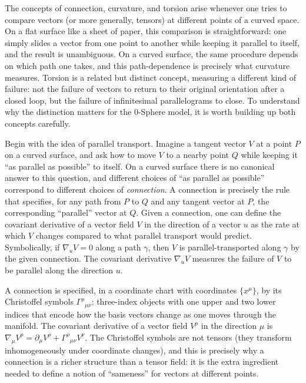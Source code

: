 \documentclass[%
 reprint,
 amsmath,amssymb,
 aps,
 prb,
]{revtex4-2}
\numberwithin{equation}{section}
\begin{document}
The concepts of connection, curvature, and torsion arise whenever one tries to compare vectors (or more generally, tensors) at different points of a curved space. On a flat surface like a sheet of paper, this comparison is straightforward: one simply slides a vector from one point to another while keeping it parallel to itself, and the result is unambiguous. On a curved surface, the same procedure depends on which path one takes, and this path-dependence is precisely what curvature measures. Torsion is a related but distinct concept, measuring a different kind of failure: not the failure of vectors to return to their original orientation after a closed loop, but the failure of infinitesimal parallelograms to close. To understand why the distinction matters for the 0-Sphere model, it is worth building up both concepts carefully.

Begin with the idea of parallel transport. Imagine a tangent vector $V$ at a point $P$ on a curved surface, and ask how to move $V$ to a nearby point $Q$ while keeping it ``as parallel as possible'' to itself. On a curved surface there is no canonical answer to this question, and different choices of ``as parallel as possible'' correspond to different choices of \emph{connection}. A connection is precisely the rule that specifies, for any path from $P$ to $Q$ and any tangent vector at $P$, the corresponding ``parallel'' vector at $Q$. Given a connection, one can define the covariant derivative of a vector field $V$ in the direction of a vector $u$ as the rate at which $V$ changes compared to what parallel transport would predict. Symbolically, if $\nabla_u V = 0$ along a path $\gamma$, then $V$ is parallel-transported along $\gamma$ by the given connection. The covariant derivative $\nabla_u V$ measures the failure of $V$ to be parallel along the direction $u$.

A connection is specified, in a coordinate chart with coordinates $\{x^\mu\}$, by its Christoffel symbols $\Gamma^\rho{}_{\mu\nu}$: three-index objects with one upper and two lower indices that encode how the basis vectors change as one moves through the manifold. The covariant derivative of a vector field $V^\rho$ in the direction $\mu$ is $\nabla_\mu V^\rho = \partial_\mu V^\rho + \Gamma^\rho{}_{\mu\nu} V^\nu$. The Christoffel symbols are not tensors (they transform inhomogeneously under coordinate changes), and this is precisely why a connection is a richer structure than a tensor field: it is the extra ingredient needed to define a notion of ``sameness'' for vectors at different points.
\end{document}
